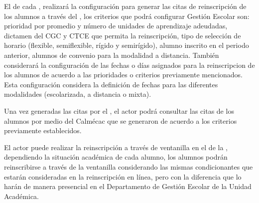 \begin{PDescripcion}
\begin{enumerate}
		\Ppaso[\PSubProceso]  El  de cada , realizará la configuración para generar las citas de reinscripción de los alumnos a través del , los criterios que podrá configurar Gestión Escolar son: prioridad por promedio y número de unidades de aprendizaje adeudadas, dictamen del CGC y CTCE que permita la reinscripción, tipo de selección de horario (flexible, semiflexible, rígido y semirígido), alumno inscrito en el periodo anterior, alumnos de convenio para la modalidad a distancia. También considerará la configuración de las fechas o días asignados para la reinscripcion de los alumnos de acuerdo a las prioridades o criterios previamente mencionados. Esta configuración considera la definición de fechas para las diferentes modalidades (escolarizada, a distancia o mixta).
		
		\Ppaso[\PSubProceso]  Una vez generadas las citas por el  , el actor podrá consultar las citas de los alumnos por medio del Calmécac que se generaron de acuerdo a los criterios previamente establecidos.
		
		\Ppaso[\PSubProceso]  El actor puede realizar la reinscripción a través de ventanilla en el  de la , dependiendo la situación académica de cada alumno, los alumnos podrán reinscribirse a través de la ventanilla considerando las mismas condicionantes que estarán consideradas en la reinscripción en línea, pero con la diferencia que lo harán de manera presencial en el Departamento de Gestión Escolar de la Unidad Académica.
		

\end{enumerate}
\end{PDescripcion}

